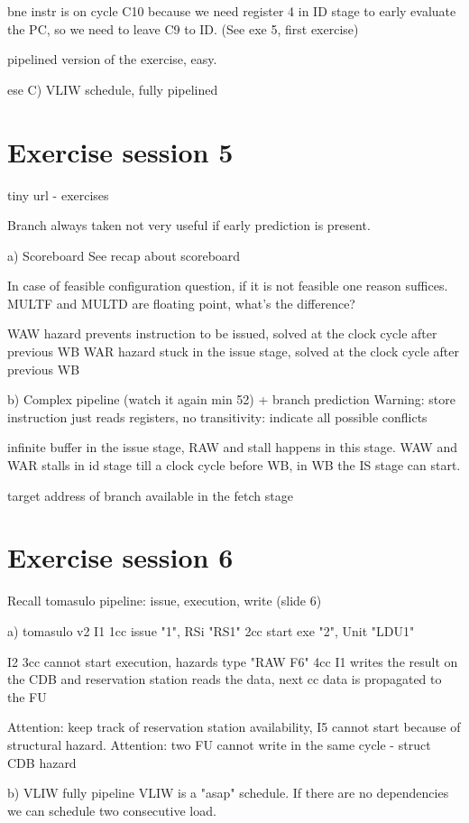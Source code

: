 bne instr is on cycle C10 because we need register 4 in ID stage to early evaluate the PC, so we need to leave C9 to ID.
(See exe 5, first exercise)

pipelined version of the exercise, easy.

ese C) VLIW schedule, fully pipelined

\section{Exercise session 5}\label{sec:exercise-session-5}
tiny url - exercises

Branch always taken not very useful if early prediction is present.

a) Scoreboard
See recap about scoreboard

In case of feasible configuration question, if it is not feasible one reason suffices.
MULTF and MULTD are floating point, what's the difference?

WAW hazard prevents instruction to be issued, solved at the clock cycle after previous WB
WAR hazard stuck in the issue stage, solved at the clock cycle after previous WB

b) Complex pipeline (watch it again min 52) + branch prediction
Warning: store instruction just reads registers, no transitivity: indicate all possible conflicts

infinite buffer in the issue stage, RAW and stall happens in this stage.
WAW and WAR stalls in id stage till a clock cycle before WB, in WB the IS stage can start.

target address of branch available in the fetch stage


\section{Exercise session 6}\label{sec:exercise-sessione-7}
Recall tomasulo pipeline: issue, execution, write (slide 6)

a) tomasulo v2
I1
1cc issue "1", RSi "RS1"
2cc start exe "2", Unit "LDU1"

I2
3cc cannot start execution, hazards type "RAW F6"
4cc I1 writes the result on the CDB and reservation station reads the data, next cc data is propagated to the FU

Attention: keep track of reservation station availability, I5 cannot start because of structural hazard.
Attention: two FU cannot write in the same cycle - struct CDB hazard

b) VLIW fully pipeline
VLIW is a "asap" schedule.
If there are no dependencies we can schedule two consecutive load.

